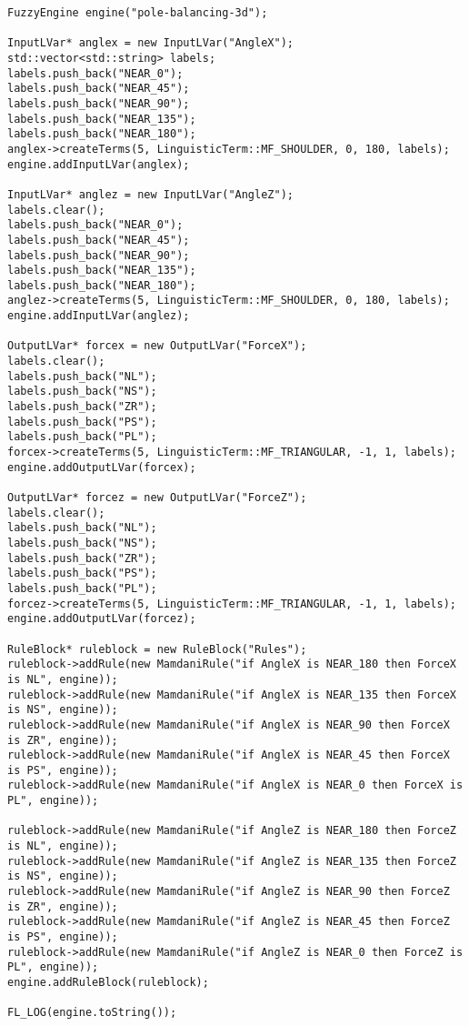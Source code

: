 	\begin{lstlisting}[firstnumber=1,tabsize=2]
FuzzyEngine engine("pole-balancing-3d");

InputLVar* anglex = new InputLVar("AngleX");
std::vector<std::string> labels;
labels.push_back("NEAR_0");
labels.push_back("NEAR_45");
labels.push_back("NEAR_90");
labels.push_back("NEAR_135");
labels.push_back("NEAR_180");
anglex->createTerms(5, LinguisticTerm::MF_SHOULDER, 0, 180, labels);
engine.addInputLVar(anglex);

InputLVar* anglez = new InputLVar("AngleZ");
labels.clear();
labels.push_back("NEAR_0");
labels.push_back("NEAR_45");
labels.push_back("NEAR_90");
labels.push_back("NEAR_135");
labels.push_back("NEAR_180");
anglez->createTerms(5, LinguisticTerm::MF_SHOULDER, 0, 180, labels);
engine.addInputLVar(anglez);

OutputLVar* forcex = new OutputLVar("ForceX");
labels.clear();
labels.push_back("NL");
labels.push_back("NS");
labels.push_back("ZR");
labels.push_back("PS");
labels.push_back("PL");
forcex->createTerms(5, LinguisticTerm::MF_TRIANGULAR, -1, 1, labels);
engine.addOutputLVar(forcex);

OutputLVar* forcez = new OutputLVar("ForceZ");
labels.clear();
labels.push_back("NL");
labels.push_back("NS");
labels.push_back("ZR");
labels.push_back("PS");
labels.push_back("PL");
forcez->createTerms(5, LinguisticTerm::MF_TRIANGULAR, -1, 1, labels);
engine.addOutputLVar(forcez);

RuleBlock* ruleblock = new RuleBlock("Rules");
ruleblock->addRule(new MamdaniRule("if AngleX is NEAR_180 then ForceX is NL", engine));
ruleblock->addRule(new MamdaniRule("if AngleX is NEAR_135 then ForceX is NS", engine));
ruleblock->addRule(new MamdaniRule("if AngleX is NEAR_90 then ForceX is ZR", engine));
ruleblock->addRule(new MamdaniRule("if AngleX is NEAR_45 then ForceX is PS", engine));
ruleblock->addRule(new MamdaniRule("if AngleX is NEAR_0 then ForceX is PL", engine));

ruleblock->addRule(new MamdaniRule("if AngleZ is NEAR_180 then ForceZ is NL", engine));
ruleblock->addRule(new MamdaniRule("if AngleZ is NEAR_135 then ForceZ is NS", engine));
ruleblock->addRule(new MamdaniRule("if AngleZ is NEAR_90 then ForceZ is ZR", engine));
ruleblock->addRule(new MamdaniRule("if AngleZ is NEAR_45 then ForceZ is PS", engine));
ruleblock->addRule(new MamdaniRule("if AngleZ is NEAR_0 then ForceZ is PL", engine));
engine.addRuleBlock(ruleblock);

FL_LOG(engine.toString());
	\end{lstlisting}


